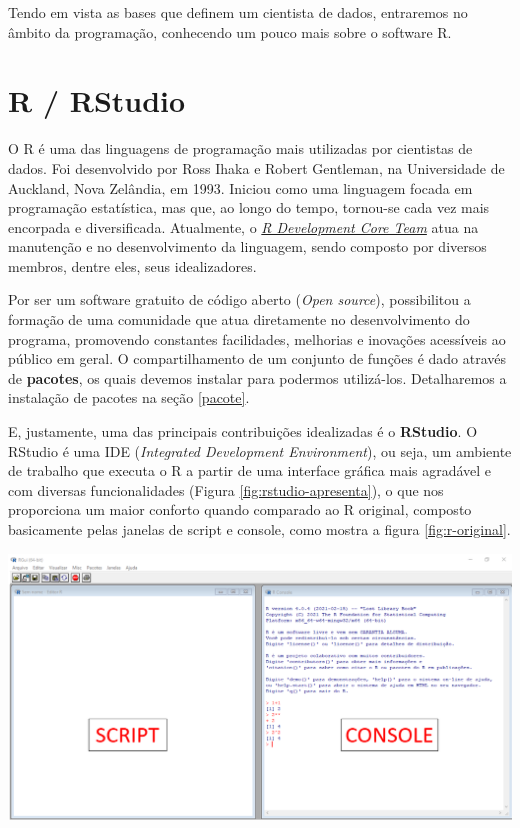 \documentclass[
  brazilian,
]{book}
\let\origfigure\figure
\let\endorigfigure\endfigure
\renewenvironment{figure}[1][2] {
    \expandafter\origfigure\expandafter[H]
} {
    \endorigfigure
}
\begin{document}
Tendo em vista as bases que definem um cientista de dados, entraremos no âmbito da programação, conhecendo um pouco mais sobre o software R.

\hypertarget{r-rstudio}{%
\section{R / RStudio}\label{r-rstudio}}

O R é uma das linguagens de programação mais utilizadas por cientistas de dados. Foi desenvolvido por Ross Ihaka e Robert Gentleman, na Universidade de Auckland, Nova Zelândia, em 1993. Iniciou como uma linguagem focada em programação estatística, mas que, ao longo do tempo, tornou-se cada vez mais encorpada e diversificada. Atualmente, o \href{https://www.r-project.org/foundation/}{\emph{R Development Core Team}} atua na manutenção e no desenvolvimento da linguagem, sendo composto por diversos membros, dentre eles, seus idealizadores.

Por ser um software gratuito de código aberto (\emph{Open source}), possibilitou a formação de uma comunidade que atua diretamente no desenvolvimento do programa, promovendo constantes facilidades, melhorias e inovações acessíveis ao público em geral. O compartilhamento de um conjunto de funções é dado através de \textbf{pacotes}, os quais devemos instalar para podermos utilizá-los. Detalharemos a instalação de pacotes na seção \ref{pacote}.

E, justamente, uma das principais contribuições idealizadas é o \textbf{RStudio}. O RStudio é uma IDE (\emph{Integrated Development Environment}), ou seja, um ambiente de trabalho que executa o R a partir de uma interface gráfica mais agradável e com diversas funcionalidades (Figura \ref{fig:rstudio-apresenta}), o que nos proporciona um maior conforto quando comparado ao R original, composto basicamente pelas janelas de script e console, como mostra a figura \ref{fig:r-original}.

\begin{figure}

{\centering \includegraphics[width=0.7\linewidth]{imagens/r_tela_basico} 

}

\caption{Tela do R original. Composto apenas pelo script e console.}\label{fig:r-original}
\end{figure}
\end{document}
